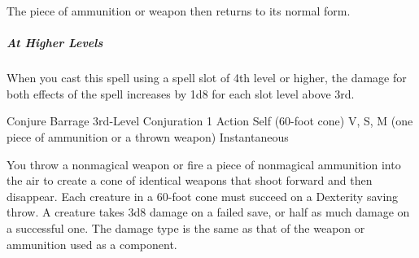 \documentclass[letterpaper,openany,oneside,twocolumn]{book}
\begin{document}
The piece of ammunition or weapon then returns to its normal form. 

\subparagraph*{At Higher Levels} When you cast this spell using a spell slot of 4th level or higher, the damage for both effects of the spell increases by 1d8 for each slot level above 3rd.

\DndSpellHeader
  {Conjure Barrage}
  {3rd-Level Conjuration}
  {1 Action}
  {Self (60-foot cone)}
  {V, S, M (one piece of ammunition or a thrown weapon)}
  {Instantaneous}

You throw a nonmagical weapon or fire a piece of nonmagical ammunition into the air to create a cone of identical weapons that shoot forward and then disappear. Each creature in a 60-foot cone must succeed on a Dexterity saving throw. A creature takes 3d8 damage on a failed save, or half as much damage on a successful one. The damage type is the same as that of the weapon or ammunition used as a component.
\end{document}
